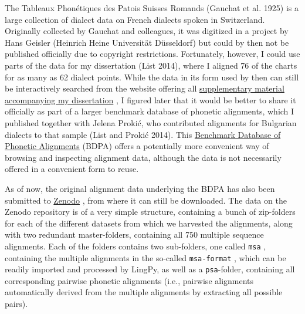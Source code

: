 \documentclass[
  a4paper,
  14pt,
  oneside,
  tablecaptionabove
]{scrbook}
\newcommand{\passthrough}[1]{#1}
\begin{document}
The Tableaux Phonétiques des Patois Suisses Romands (Gauchat et al.
1925) is a large collection of dialect data on French dialects spoken in
Switzerland. Originally collected by Gauchat and colleagues, it was
digitized in a project by Hans Geisler (Heinrich Heine Universität
Düsseldorf) but could by then not be published officially due to
copyright restrictions. Fortunately, however, I could use parts of the
data for my dissertation (List 2014), where I aligned 76 of the charts
for as many as 62 dialect points. While the data in its form used by
then can still be interactively searched from the website offering all
\href{https://sequencecomparison.github.io}{supplementary material
accompanying my dissertation} , I figured later that it would be better
to share it officially as part of a larger benchmark database of
phonetic alignments, which I published together with Jelena Prokić, who
contributed alignments for Bulgarian dialects to that sample (List and
Prokić 2014). This \href{http://alignments.lingpy.org}{Benchmark
Database of Phonetic Alignments} (BDPA) offers a potentially more
convenient way of browsing and inspecting alignment data, although the
data is not necessarily offered in a convenient form to reuse.

As of now, the original alignment data underlying the BDPA has also been
submitted to \href{https://zenodo.org/record/11880}{Zenodo} , from where
it can still be downloaded. The data on the Zenodo repository is of a
very simple structure, containing a bunch of zip-folders for each of the
different datasets from which we harvested the alignments, along with
two redundant master-folders, containing all 750 multiple sequence
alignments. Each of the folders contains two sub-folders, one called
\passthrough{\lstinline!msa!} , containing the multiple alignments in
the so-called \passthrough{\lstinline!msa-format!} , which can be
readily imported and processed by LingPy, as well as a
\passthrough{\lstinline!psa!}-folder, containing all corresponding
pairwise phonetic alignments (i.e., pairwise alignments automatically
derived from the multiple alignments by extracting all possible pairs).
\end{document}
